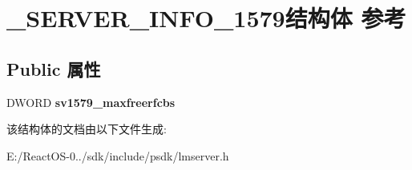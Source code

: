 \hypertarget{struct___s_e_r_v_e_r___i_n_f_o__1579}{}\section{\+\_\+\+S\+E\+R\+V\+E\+R\+\_\+\+I\+N\+F\+O\+\_\+1579结构体 参考}
\label{struct___s_e_r_v_e_r___i_n_f_o__1579}
\subsection*{Public 属性}
\begin{DoxyCompactItemize}
\item 
\mbox{\label{struct___s_e_r_v_e_r___i_n_f_o__1579_a7bd9012a9316c1d7c51d5261460500bf}} 
D\+W\+O\+RD {\bfseries sv1579\+\_\+maxfreerfcbs}
\end{DoxyCompactItemize}


该结构体的文档由以下文件生成\+:\begin{DoxyCompactItemize}
\item 
E\+:/\+React\+O\+S-\/0../sdk/include/psdk/lmserver.\+h\end{DoxyCompactItemize}
